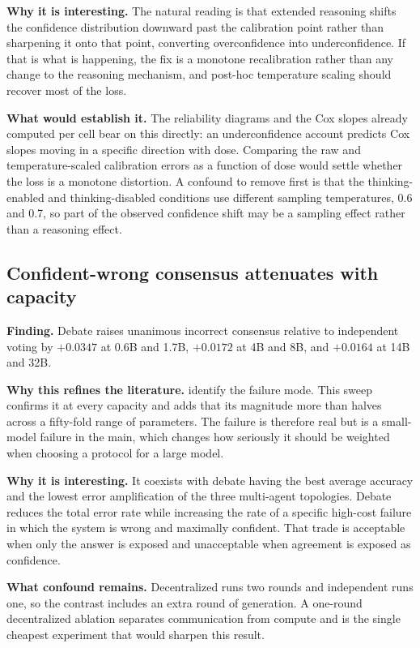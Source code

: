 \textbf{Why it is interesting.} The natural reading is that extended reasoning shifts the
confidence distribution downward past the calibration point rather than sharpening it onto
that point, converting overconfidence into underconfidence. If that is what is happening,
the fix is a monotone recalibration rather than any change to the reasoning mechanism, and
post-hoc temperature scaling should recover most of the loss.

\textbf{What would establish it.} The reliability diagrams and the Cox slopes already
computed per cell bear on this directly: an underconfidence account predicts Cox slopes
moving in a specific direction with dose. Comparing the raw and temperature-scaled
calibration errors as a function of dose would settle whether the loss is a monotone
distortion. A confound to remove first is that the thinking-enabled and thinking-disabled
conditions use different sampling temperatures, 0.6 and 0.7, so part of the observed
confidence shift may be a sampling effect rather than a reasoning effect.

\subsection{Confident-wrong consensus attenuates with capacity}

\textbf{Finding.} Debate raises unanimous incorrect consensus relative to independent voting
by $+0.0347$ at 0.6B and 1.7B, $+0.0172$ at 4B and 8B, and $+0.0164$ at 14B and 32B.

\textbf{Why this refines the literature.} \citet{wynn2025debate} identify the failure mode.
This sweep confirms it at every capacity and adds that its magnitude more than halves across
a fifty-fold range of parameters. The failure is therefore real but is a small-model failure
in the main, which changes how seriously it should be weighted when choosing a protocol for
a large model.

\textbf{Why it is interesting.} It coexists with debate having the best average accuracy and
the lowest error amplification of the three multi-agent topologies. Debate reduces the total
error rate while increasing the rate of a specific high-cost failure in which the system is
wrong and maximally confident. That trade is acceptable when only the answer is exposed and
unacceptable when agreement is exposed as confidence.

\textbf{What confound remains.} Decentralized runs two rounds and independent runs one, so
the contrast includes an extra round of generation. A one-round decentralized ablation
separates communication from compute and is the single cheapest experiment that would
sharpen this result.

